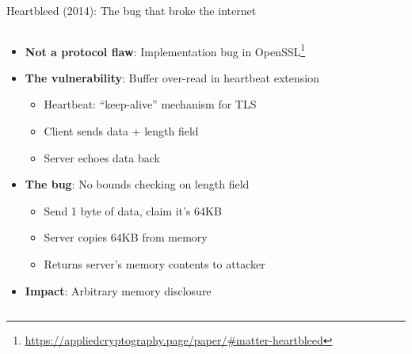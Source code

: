 \documentclass[aspectratio=169, lualatex, handout]{beamer}
\begin{document}
\begin{frame}{Heartbleed (2014): The bug that broke the internet}
	\begin{columns}[c]
		\begin{column}{1\textwidth}
			\begin{itemize}
				\item \textbf{Not a protocol flaw}: Implementation bug in OpenSSL\footnote{\url{https://appliedcryptography.page/paper/\#matter-heartbleed}}
				\item \textbf{The vulnerability}: Buffer over-read in heartbeat extension
				      \begin{itemize}
					      \item Heartbeat: ``keep-alive'' mechanism for TLS
					      \item Client sends data + length field
					      \item Server echoes data back
				      \end{itemize}
				\item \textbf{The bug}: No bounds checking on length field
				      \begin{itemize}
					      \item Send 1 byte of data, claim it's 64KB
					      \item Server copies 64KB from memory
					      \item Returns server's memory contents to attacker
				      \end{itemize}
				\item \textbf{Impact}: Arbitrary memory disclosure
			\end{itemize}
		\end{column}
	\end{columns}
\end{frame}
\end{document}
